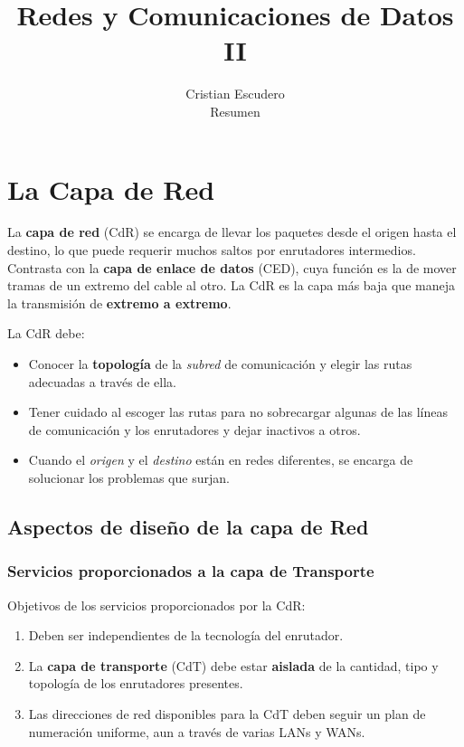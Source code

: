 \documentclass[10pt,a4paper]{article}
\title{Redes y Comunicaciones de Datos II}
\author{Cristian Escudero \\ \small{Resumen}}
\begin{document}
\maketitle

\section{La Capa de Red}

La \textbf{capa de red} (CdR) se encarga de llevar los paquetes desde el origen hasta el destino, lo que puede requerir muchos saltos por enrutadores intermedios. Contrasta con la \textbf{capa de enlace de datos} (CED), cuya función es la de mover tramas de un extremo del cable al otro. La CdR es la capa más baja que maneja la transmisión de \textbf{extremo a extremo}.

La CdR debe:
\begin{itemize}
\item Conocer la \textbf{topología} de la \textit{subred} de comunicación y elegir las rutas adecuadas a través de ella.
\item Tener cuidado al escoger las rutas para no sobrecargar algunas de las líneas de comunicación y los enrutadores y dejar inactivos a otros.
\item Cuando el \textit{origen} y el \textit{destino} están en redes diferentes, se encarga de solucionar los problemas que surjan.
\end{itemize}

\subsection{Aspectos de diseño de la capa de Red}

\subsubsection{Servicios proporcionados a la capa de Transporte}

Objetivos de los servicios proporcionados por la CdR:
\begin{enumerate}
\item Deben ser independientes de la tecnología del enrutador.
\item La \textbf{capa de transporte} (CdT) debe estar \textbf{aislada} de la cantidad, tipo y topología de los enrutadores presentes.
\item Las direcciones de red disponibles para la CdT deben seguir un plan de numeración uniforme, aun a través de varias LANs y WANs.
\end{enumerate}
\end{document}

